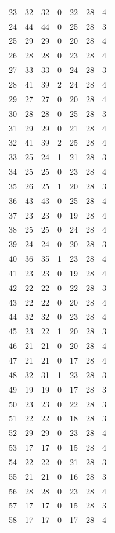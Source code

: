 \documentclass[11pt]{article}
\begin{document}
\begin{center}
\begin{longtable}{r r r r r r r}
23 & 32 & 32 & 0 & 22 & 28 & 4\\
24 & 44 & 44 & 0 & 25 & 28 & 3\\
25 & 29 & 29 & 0 & 20 & 28 & 4\\
26 & 28 & 28 & 0 & 23 & 28 & 4\\
27 & 33 & 33 & 0 & 24 & 28 & 3\\
28 & 41 & 39 & 2 & 24 & 28 & 4\\
29 & 27 & 27 & 0 & 20 & 28 & 4\\
30 & 28 & 28 & 0 & 25 & 28 & 3\\
31 & 29 & 29 & 0 & 21 & 28 & 4\\
32 & 41 & 39 & 2 & 25 & 28 & 4\\
33 & 25 & 24 & 1 & 21 & 28 & 3\\
34 & 25 & 25 & 0 & 23 & 28 & 4\\
35 & 26 & 25 & 1 & 20 & 28 & 3\\
36 & 43 & 43 & 0 & 25 & 28 & 4\\
37 & 23 & 23 & 0 & 19 & 28 & 4\\
38 & 25 & 25 & 0 & 24 & 28 & 4\\
39 & 24 & 24 & 0 & 20 & 28 & 3\\
40 & 36 & 35 & 1 & 23 & 28 & 4\\
41 & 23 & 23 & 0 & 19 & 28 & 4\\
42 & 22 & 22 & 0 & 22 & 28 & 3\\
43 & 22 & 22 & 0 & 20 & 28 & 4\\
44 & 32 & 32 & 0 & 23 & 28 & 4\\
45 & 23 & 22 & 1 & 20 & 28 & 3\\
46 & 21 & 21 & 0 & 20 & 28 & 4\\
47 & 21 & 21 & 0 & 17 & 28 & 4\\
48 & 32 & 31 & 1 & 23 & 28 & 3\\
49 & 19 & 19 & 0 & 17 & 28 & 3\\
50 & 23 & 23 & 0 & 22 & 28 & 3\\
51 & 22 & 22 & 0 & 18 & 28 & 3\\
52 & 29 & 29 & 0 & 23 & 28 & 4\\
53 & 17 & 17 & 0 & 15 & 28 & 4\\
54 & 22 & 22 & 0 & 21 & 28 & 3\\
55 & 21 & 21 & 0 & 16 & 28 & 3\\
56 & 28 & 28 & 0 & 23 & 28 & 4\\
57 & 17 & 17 & 0 & 15 & 28 & 3\\
58 & 17 & 17 & 0 & 17 & 28 & 4\\

\end{longtable}
\end{center}
\end{document}
